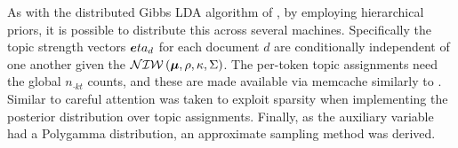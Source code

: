 As with the distributed Gibbs LDA algorithm of \cite{Newman2009}, by employing hierarchical priors, it is possible to distribute this across several machines. Specifically the topic strength vectors $\bm eta_d$ for each document $d$ are conditionally independent of one another given the $\mathcal{NIW}\left(\bm \mu, \rho, \kappa, \Sigma\right)$. The per-token topic assignments need the global $n_{\cdot k t}$ counts, and these are made available via memcache similarly to \cite{Smola2010}. Similar to \cite{Yao2009} careful attention was taken to exploit sparsity when implementing the posterior distribution over topic assignments. Finally, as the auxiliary variable had a Polygamma distribution, an approximate sampling method was derived.









